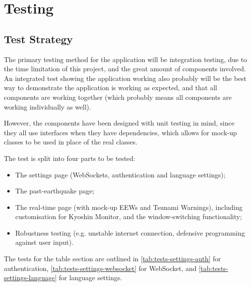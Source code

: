 \chapter{Testing}
\section{Test Strategy}

The primary testing method for the application will be integration testing, due to the time limitation of this project, and the great amount of components involved. An integrated test showing the application working also probably will be the best way to demonstrate the application is working as expected, and that all components are working together (which probably means all components are working individually as well).

However, the components have been designed with unit testing in mind, since they all use interfaces when they have dependencies, which allows for mock-up classes to be used in place of the real classes.

The test is split into four parts to be tested:
\begin{itemize}
    \item The settings page (WebSockets, authentication and language settings);
    \item The past-earthquake page;
    \item The real-time page (with mock-up EEWs and Tsunami Warnings), including customisation for Kyoshin Monitor, and the window-switching functionality;
    \item Robustness testing (e.g. unstable internet connection, defensive programming against user input).
\end{itemize}

The tests for the table section are outlined in \autoref{tab:tests-settings-auth} for authentication, \autoref{tab:tests-settings-websocket} for WebSocket, and \autoref{tab:tests-settings-language} for language settings.

